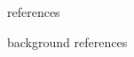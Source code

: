 \documentclass[svgnames,
               hyperref={colorlinks,citecolor=DeepPink4,linkcolor=FireBrick,urlcolor=Maroon},
               usepdftitle=false]  %
               {beamer}
\makeatletter
\newcommand\notsotiny{\@setfontsize\notsotiny\@viipt\@viiipt}
\makeatother
\begin{document}
\begin{frame}{references}

{\footnotesize

}
\end{frame}

\begin{frame}{background references}

{\footnotesize

}
\end{frame}
\end{document}
